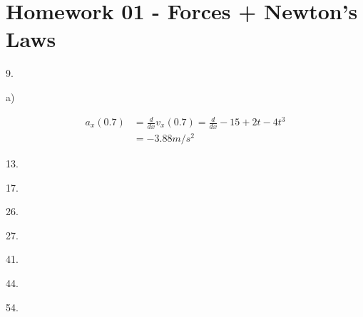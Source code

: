 \documentclass{scrreprt} %
\begin{document}
\section{Homework 01 - Forces + Newton's Laws}

9.

a)

\begin{align*}
	a_x(0.7) &= \frac{d}{dx}v_x(0.7) = \frac{d}{dx}-15 + 2t - 4t^3 \\
			 &= \boxed{-3.88 m/s^2}
\end{align*}


13.

17.

26.

27.

41.

44.

54.
\end{document}
